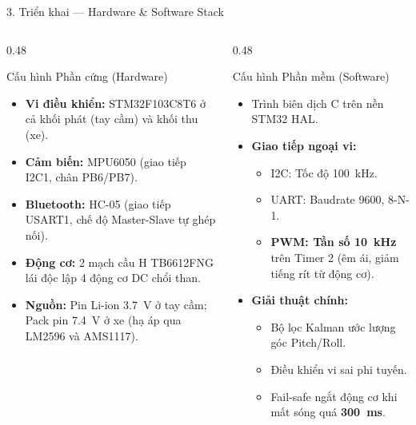 \documentclass[aspectratio=169, 10pt]{beamer}
\begin{document}
\begin{frame}{3. Triển khai — Hardware \& Software Stack}
  \begin{columns}[T]
    \begin{column}{0.48\textwidth}
      \begin{block}{Cấu hình Phần cứng (Hardware)}
        \begin{itemize}
          \item \textbf{Vi điều khiển:} STM32F103C8T6 ở cả khối phát (tay cầm) và khối thu (xe).
          \item \textbf{Cảm biến:} MPU6050 (giao tiếp I2C1, chân PB6/PB7).
          \item \textbf{Bluetooth:} HC-05 (giao tiếp USART1, chế độ Master-Slave tự ghép nối).
          \item \textbf{Động cơ:} 2 mạch cầu H TB6612FNG lái độc lập 4 động cơ DC chổi than.
          \item \textbf{Nguồn:} Pin Li-ion \qty{3.7}{\volt} ở tay cầm; Pack pin \qty{7.4}{\volt} ở xe (hạ áp qua LM2596 và AMS1117).
        \end{itemize}
      \end{block}
    \end{column}
    
    \begin{column}{0.48\textwidth}
      \begin{block}{Cấu hình Phần mềm (Software)}
        \begin{itemize}
          \item Trình biên dịch C trên nền STM32 HAL.
          \item \textbf{Giao tiếp ngoại vi:}
            \begin{itemize}
              \item I2C: Tốc độ \qty{100}{\kilo\hertz}.
              \item UART: Baudrate \qty{9600}{\bps}, 8-N-1.
              \item \textbf{PWM: Tần số \qty{10}{\kilo\hertz}} trên Timer 2 (êm ái, giảm tiếng rít từ động cơ).
            \end{itemize}
          \item \textbf{Giải thuật chính:}
            \begin{itemize}
              \item Bộ lọc Kalman ước lượng góc Pitch/Roll.
              \item Điều khiển vi sai phi tuyến.
              \item Fail-safe ngắt động cơ khi mất sóng quá \textbf{\qty{300}{\ms}}.
            \end{itemize}
        \end{itemize}
      \end{block}
    \end{column}
  \end{columns}
\end{frame}
\end{document}
